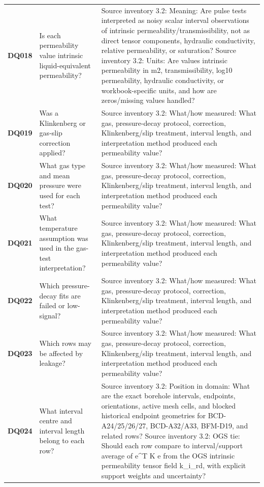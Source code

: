 \begin{longtable}{@{}L{0.09\textwidth} L{0.31\textwidth} L{0.52\textwidth}@{}}
\addlinespace[0.18em]
\textbf{DQ018} & Is each permeability value intrinsic liquid-equivalent permeability? & Source inventory 3.2: Meaning: Are pulse tests interpreted as noisy scalar interval observations of intrinsic permeability/transmissibility, not as direct tensor components, hydraulic conductivity, relative permeability, or saturation? Source inventory 3.2: Units: Are values intrinsic permeability in m2, transmissibility, log10 permeability, hydraulic conductivity, or workbook-specific units, and how are zeros/missing values handled?\\
\addlinespace[0.18em]
\textbf{DQ019} & Was a Klinkenberg or gas-slip correction applied? & Source inventory 3.2: What/how measured: What gas, pressure-decay protocol, correction, Klinkenberg/slip treatment, interval length, and interpretation method produced each permeability value?\\
\addlinespace[0.18em]
\textbf{DQ020} & What gas type and mean pressure were used for each test? & Source inventory 3.2: What/how measured: What gas, pressure-decay protocol, correction, Klinkenberg/slip treatment, interval length, and interpretation method produced each permeability value?\\
\addlinespace[0.18em]
\textbf{DQ021} & What temperature assumption was used in the gas-test interpretation? & Source inventory 3.2: What/how measured: What gas, pressure-decay protocol, correction, Klinkenberg/slip treatment, interval length, and interpretation method produced each permeability value?\\
\addlinespace[0.18em]
\textbf{DQ022} & Which pressure-decay fits are failed or low-signal? & Source inventory 3.2: What/how measured: What gas, pressure-decay protocol, correction, Klinkenberg/slip treatment, interval length, and interpretation method produced each permeability value?\\
\addlinespace[0.18em]
\textbf{DQ023} & Which rows may be affected by leakage? & Source inventory 3.2: What/how measured: What gas, pressure-decay protocol, correction, Klinkenberg/slip treatment, interval length, and interpretation method produced each permeability value?\\
\addlinespace[0.18em]
\textbf{DQ024} & What interval centre and interval length belong to each row? & Source inventory 3.2: Position in domain: What are the exact borehole intervals, endpoints, orientations, active mesh cells, and blocked historical endpoint geometries for BCD-A24/25/26/27, BCD-A32/A33, BFM-D19, and related rows? Source inventory 3.2: OGS tie: Should each row compare to interval/support average of e\textasciicircum{}T K e from the OGS intrinsic permeability tensor field k\_i\_rd, with explicit support weights and uncertainty?\\

\end{longtable}
